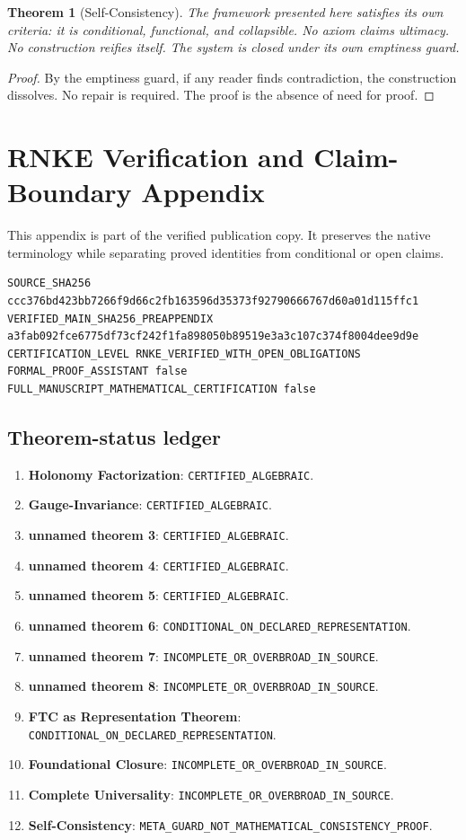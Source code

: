 \documentclass[12pt, oneside]{article}
\newtheorem{theorem}{Theorem}[section]
\begin{document}
\begin{theorem}[Self-Consistency]
The framework presented here satisfies its own criteria: it is conditional, functional, and collapsible. No axiom claims ultimacy. No construction reifies itself. The system is closed under its own emptiness guard.
\end{theorem}

\begin{proof}
By the emptiness guard, if any reader finds contradiction, the construction dissolves. No repair is required. The proof is the absence of need for proof.
\end{proof}

\clearpage
\section{RNKE Verification and Claim-Boundary Appendix}
This appendix is part of the verified publication copy. It preserves the native terminology while separating proved identities from conditional or open claims.
\begin{verbatim}
SOURCE_SHA256 ccc376bd423bb7266f9d66c2fb163596d35373f92790666767d60a01d115ffc1
VERIFIED_MAIN_SHA256_PREAPPENDIX a3fab092fce6775df73cf242f1fa898050b89519e3a3c107c374f8004dee9d9e
CERTIFICATION_LEVEL RNKE_VERIFIED_WITH_OPEN_OBLIGATIONS
FORMAL_PROOF_ASSISTANT false
FULL_MANUSCRIPT_MATHEMATICAL_CERTIFICATION false
\end{verbatim}
\subsection{Theorem-status ledger}
\begin{enumerate}
\item \textbf{Holonomy Factorization}: \texttt{CERTIFIED\_ALGEBRAIC}.
\item \textbf{Gauge-Invariance}: \texttt{CERTIFIED\_ALGEBRAIC}.
\item \textbf{unnamed theorem 3}: \texttt{CERTIFIED\_ALGEBRAIC}.
\item \textbf{unnamed theorem 4}: \texttt{CERTIFIED\_ALGEBRAIC}.
\item \textbf{unnamed theorem 5}: \texttt{CERTIFIED\_ALGEBRAIC}.
\item \textbf{unnamed theorem 6}: \texttt{CONDITIONAL\_ON\_DECLARED\_REPRESENTATION}.
\item \textbf{unnamed theorem 7}: \texttt{INCOMPLETE\_OR\_OVERBROAD\_IN\_SOURCE}.
\item \textbf{unnamed theorem 8}: \texttt{INCOMPLETE\_OR\_OVERBROAD\_IN\_SOURCE}.
\item \textbf{FTC as Representation Theorem}: \texttt{CONDITIONAL\_ON\_DECLARED\_REPRESENTATION}.
\item \textbf{Foundational Closure}: \texttt{INCOMPLETE\_OR\_OVERBROAD\_IN\_SOURCE}.
\item \textbf{Complete Universality}: \texttt{INCOMPLETE\_OR\_OVERBROAD\_IN\_SOURCE}.
\item \textbf{Self-Consistency}: \texttt{META\_GUARD\_NOT\_MATHEMATICAL\_CONSISTENCY\_PROOF}.
\end{enumerate}
\end{document}
